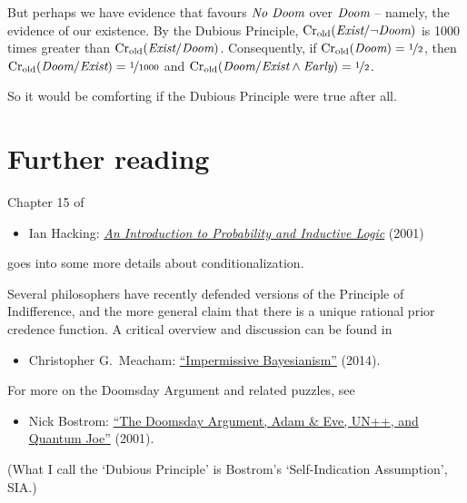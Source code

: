 But perhaps we have evidence that favours $\emph{No Doom}$
over $\emph{Doom}$ -- namely, the evidence of our existence. By the
Dubious Principle, $\text{Cr$_{\text{old}}$}(\emph{Exist}/\neg\emph{Doom})$ is 1000
times greater than $\text{Cr$_{\text{old}}$}(\emph{Exist}/\emph{Doom})$. Consequently,
if $\text{Cr$_{\text{old}}$}(\emph{Doom}) = \nicefrac{1}{2}$, then
$\text{Cr$_{\text{old}}$}(\emph{Doom}/\emph{Exist}) = \nicefrac{1}{1000}$ and
$\text{Cr$_{\text{old}}$}(\emph{Doom}/\emph{Exist} \land \emph{Early}) = \nicefrac{1}{2}$.

So it would be comforting if the Dubious Principle were true after all.



\newpage

\section{Further reading}

Chapter 15 of 
\begin{itemize}
\item Ian Hacking: \href{http://fitelson.org/confirmation/hacking_introduction_to_probability_and_inductive_logic.pdf}{\emph{An Introduction to Probability and Inductive Logic}} (2001)
\end{itemize}
goes into some more details about conditionalization. 

Several philosophers have recently defended versions of the Principle
of Indifference, and the more general claim that there is a unique
rational prior credence function. A critical overview and discussion
can be found in
\begin{itemize}
\item Christopher G.\ Meacham: \href{http://people.umass.edu/cmeacham/Meacham.Impermissive.Bayesiansim.pdf}{``Impermissive Bayesianism''} (2014).
\end{itemize}


For more on the Doomsday Argument and related puzzles, see
\begin{itemize}
\item Nick Bostrom:
  \href{http://www.anthropic-principle.com/preprints/cau/paradoxes.html}{``The
    Doomsday Argument, Adam \& Eve, UN++, and Quantum Joe''} (2001).
\end{itemize}
(What I call the `Dubious Principle' is Bostrom's `Self-Indication Assumption', SIA.)

